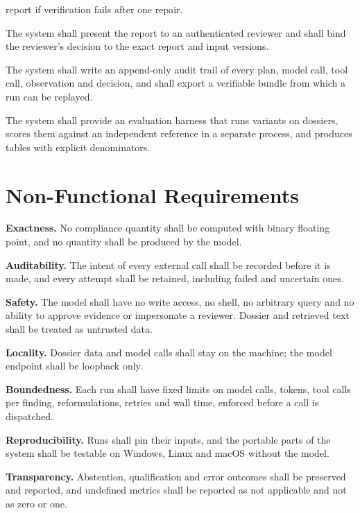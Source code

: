 \begin{description}[itemsep=2pt,font=\normalfont\bfseries,leftmargin=1.2cm,labelwidth=1cm]
           report if verification fails after one repair.
\item[FR11] The system shall present the report to an authenticated reviewer and shall bind the reviewer's
           decision to the exact report and input versions.
\item[FR12] The system shall write an append-only audit trail of every plan, model call, tool call,
           observation and decision, and shall export a verifiable bundle from which a run can be replayed.
\item[FR13] The system shall provide an evaluation harness that runs variants on dossiers, scores them
           against an independent reference in a separate process, and produces tables with explicit
           denominators.
\end{description}

\section{Non-Functional Requirements}
\begin{description}[itemsep=2pt,font=\normalfont\bfseries,leftmargin=1.2cm,labelwidth=1cm]
\item[NFR1] \textbf{Exactness.} No compliance quantity shall be computed with binary floating point, and no
            quantity shall be produced by the model.
\item[NFR2] \textbf{Auditability.} The intent of every external call shall be recorded before it is made, and
            every attempt shall be retained, including failed and uncertain ones.
\item[NFR3] \textbf{Safety.} The model shall have no write access, no shell, no arbitrary query and no
            ability to approve evidence or impersonate a reviewer. Dossier and retrieved text shall be
            treated as untrusted data.
\item[NFR4] \textbf{Locality.} Dossier data and model calls shall stay on the machine; the model endpoint
            shall be loopback only.
\item[NFR5] \textbf{Boundedness.} Each run shall have fixed limits on model calls, tokens, tool calls per
            finding, reformulations, retries and wall time, enforced before a call is dispatched.
\item[NFR6] \textbf{Reproducibility.} Runs shall pin their inputs, and the portable parts of the system
            shall be testable on Windows, Linux and macOS without the model.
\item[NFR7] \textbf{Transparency.} Abstention, qualification and error outcomes shall be preserved and reported,
            and undefined metrics shall be reported as not applicable and not as zero or one.
\end{description}

